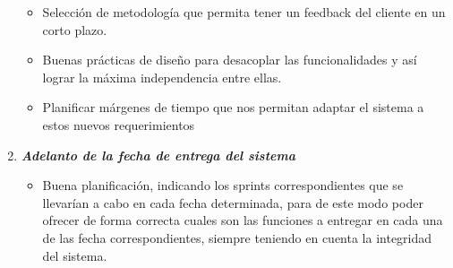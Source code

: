 \begin{enumerate}
\begin{itemize}
                \item Selección de metodología que permita tener un feedback del cliente en un corto plazo.
                \item Buenas prácticas de diseño para desacoplar las funcionalidades y así lograr la máxima independencia entre ellas.
                \item Planificar márgenes de tiempo que nos permitan adaptar el sistema a estos nuevos requerimientos
			\end{itemize}
        \item \textbf{\textit{Adelanto de la fecha de entrega del sistema}}
        	\begin{itemize}
				\item Buena planificación, indicando los sprints correspondientes que se llevarían a cabo en cada fecha determinada, para de este modo poder ofrecer de forma correcta cuales son las funciones a entregar en cada una de las fecha correspondientes, siempre teniendo en cuenta la integridad del sistema.
			\end{itemize}
	\end{enumerate}

